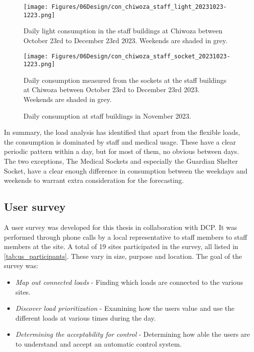 \begin{figure}[]
  \centering
  \begin{minipage}{0.7\textwidth} %
    \centering
    \texttt{[image: Figures/06Design/con\_chiwoza\_staff\_light\_20231023-1223.png]}
    \caption[Staff Light consumption Chiwoza 20231023-1223]{Daily light consumption in the staff buildings at Chiwoza between October 23rd to December 23rd 2023. Weekends are shaded in grey.}
    \label{fig:con_chiwoza_staff_light_20231023-1223}
  \end{minipage}

  \vspace{0.5cm} %

  \begin{minipage}{0.7\textwidth} %
    \centering
    \texttt{[image: Figures/06Design/con\_chiwoza\_staff\_socket\_20231023-1223.png]}
    \caption[Staff Socket consumption Chiwoza 20231023-1223]{Daily consumption measured from the sockets at the staff buildings at Chiwoza between October 23rd to December 23rd 2023. Weekends are shaded in grey.}
    \label{fig:con_chiwoza_staff_socket_20231023-1223}
  \end{minipage}

  \caption[Staff consumption Chiwoza 20231023-1223]{Daily consumption at staff buildings in November 2023.}
  \label{fig:con_chiwoza_staff_20231023-1223}
\end{figure}

In summary, the load analysis has identified that apart from the flexible loads, the consumption is dominated by staff and medical usage. These have a clear periodic pattern within a day, but for most of them, no obvious between days. The two exceptions, The Medical Sockets and especially the Guardian Shelter Socket, have a clear enough difference in consumption between the weekdays and weekends to warrant extra consideration for the forecasting.

\subsection{User survey}\label{seq:user_survey}
A user survey was developed for this thesis in collaboration with DCP. It was performed through phone calls by a local representative to staff members to staff members at the site. A total of 19 sites participated in the survey, all listed in \ref{tab:us_participants}. These vary in size, purpose and location. The goal of the survey was:
\begin{itemize}
    \item \textit{Map out connected loads}  - Finding which loads are connected to the various sites.
    \item \textit{Discover load prioritization} - Examining how the users value and use the different loads at various times during the day.
    \item \textit{Determining the acceptability for control}    - Determining how able the users are to understand and accept an automatic control system. 
\end{itemize}

